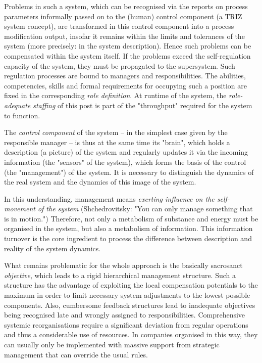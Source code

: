 \documentclass[11pt,a4paper]{article}
\begin{document}
Problems in such a system, which can be recognised via the reports on process
parameters informally passed on to the (human) control component (a TRIZ
system concept), are transformed in this control component into a process
modification output, insofar it remains within the limits and tolerances of
the system (more precisely: in the system description). Hence such problems
can be compensated within the system itself. If the problems exceed the
self-regulation capacity of the system, they must be propagated to the
supersystem.  Such regulation processes are bound to managers and
responsibilities. The abilities, competencies, skills and formal requirements
for occupying such a position are fixed in the corresponding \emph{role
  definition}. At runtime of the system, the \emph{role-adequate staffing} of
this post is part of the "throughput" required for the system to function.

The \emph{control component} of the system -- in the simplest case given by
the responsible manager -- is thus at the same time its "brain", which holds a
description (a picture) of the system and regularly updates it via the
incoming information (the "sensors" of the system), which forms the basis of
the control (the "management") of the system. It is necessary to distinguish
the dynamics of the real system and the dynamics of this image of the system.

In this understanding, management means \emph{exerting influence on the
  self-movement of the system} (Shchedrovitsky: "You can only manage something
that is in motion.") Therefore, not only a metabolism of substance and energy
must be organised in the system, but also a metabolism of information. This
information turnover is the core ingredient to process the difference between
description and reality of the system dynamics.

What remains problematic for the whole approach is the basically sacrosanct
\emph{objective}, which leads to a rigid hierarchical management structure.
Such a structure has the advantage of exploiting the local compensation
potentials to the maximum in order to limit necessary system adjustments to
the lowest possible components. Also, cumbersome feedback structures lead to
inadequate objectives being recognised late and wrongly assigned to
responsibilities. Comprehensive systemic reorganisations require a significant
deviation from regular operations and thus a considerable use of resources.
In companies organised in this way, they can usually only be implemented with
massive support from strategic management that can override the usual rules. 
\end{document}

